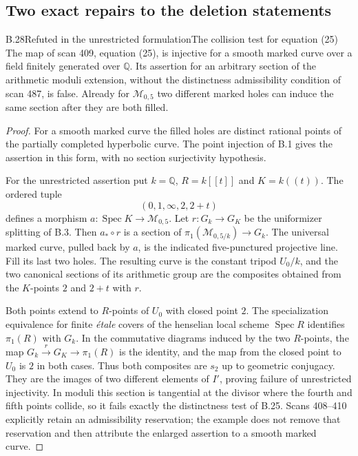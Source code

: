 \subsection{Two exact repairs to the deletion statements}

\begin{statement}{B.28}{Refuted in the unrestricted formulation}{The collision test for equation (25)}
The map of scan 409, equation (25), is injective for a smooth
marked curve over a field finitely generated over $\mathbb Q$.
Its assertion for an arbitrary section of the arithmetic moduli
extension, without the distinctness admissibility condition of
scan 487, is false.  Already for $\mathcal M_{0,5}$ two different
marked holes can induce the same section after they are both filled.
\end{statement}
\begin{proof}
For a smooth marked curve the filled holes are distinct rational
points of the partially completed hyperbolic curve.  The point
injection of B.1 gives the assertion in this form, with no section
surjectivity hypothesis.

For the unrestricted assertion put $k=\mathbb Q$,
$R=k[[t]]$ and $K=k((t))$.  The ordered tuple
\[
 (0,1,\infty,2,2+t)
\]
defines a morphism $a:\operatorname{Spec}K\to\mathcal M_{0,5}$.
Let $r:G_k\to G_K$ be the uniformizer splitting of B.3.
Then $a_*\circ r$ is a section of
$\pi_1(\mathcal M_{0,5/k})\to G_k$.
The universal marked curve, pulled back by $a$, is the indicated
five-punctured projective line.  Fill its last two holes.  The
resulting curve is the constant tripod $U_0/k$, and the two
canonical sections of its arithmetic group are the composites
obtained from the $K$-points $2$ and $2+t$ with $r$.

Both points extend to $R$-points of $U_0$ with closed point $2$.
The specialization equivalence for finite \emph{\'etale} covers of
the henselian local scheme $\operatorname{Spec}R$ identifies
$\pi_1(R)$ with $G_k$.  In the commutative diagrams induced by the
two $R$-points, the map $G_k\xrightarrow{r}G_K\to\pi_1(R)$ is the
identity, and the map from the closed point to $U_0$ is $2$ in both
cases.  Thus both composites are $s_2$ up to geometric conjugacy.
They are the images of two different elements of $I'$, proving
failure of unrestricted injectivity.  In moduli this section is
tangential at the divisor where the fourth and fifth points
collide, so it fails exactly the distinctness test of B.25.
Scans 408--410 explicitly retain an admissibility reservation;
the example does not remove that reservation and then attribute
the enlarged assertion to a smooth marked curve.
\end{proof}

